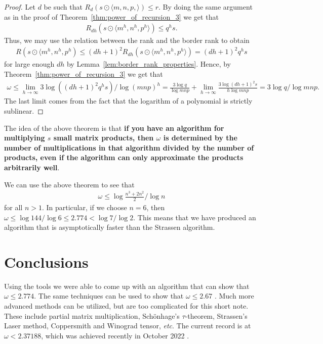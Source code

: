 \documentclass{article}
\theoremstyle{plain}
\theoremstyle{definition}
\theoremstyle{remark}
\begin{document}
\begin{proof}
Let $d$ be such that $R_d(s \odot \langle m, n, p, \rangle) \leq r$. By doing the same argument as in the proof of Theorem~\ref{thm:power_of_recursion_3} we get that
\begin{align*}
    R_{dh}(s \odot \langle m^h, n^h, p^h \rangle) \leq q^h s.
\end{align*}
Thus, we may use the relation between the rank and the border rank to obtain
\begin{align*}
    R(s \odot \langle m^h, n^h, p^h) \leq (dh + 1)^2 R_{dh}(s \odot \langle m^h, n^h, p^h \rangle) = (dh + 1)^2 q^h s
\end{align*}
for large enough $dh$ by Lemma~\ref{lem:border_rank_properties}. Hence, by Theorem~\ref{thm:power_of_recursion_3} we get that
\begin{align*}
    \omega \leq \lim_{h \to \infty} 3 \log \left( (dh + 1)^2 q^h s \right) / \log (mnp)^h = \frac{3\log q}{\log mnp} + \lim_{h \to \infty} \frac{3 \log (dh + 1)^2 s}{h \log mnp} = 3 \log q / \log mnp.
\end{align*}
The last limit comes from the fact that the logarithm of a polynomial is strictly sublinear.
\end{proof}

The idea of the above theorem is that \textbf{if you have an algorithm for multiplying $s$ small matrix products, then $\omega$ is determined by the number of multiplications in that algorithm divided by the number of products, even if the algorithm can only approximate the products arbitrarily well}. 

We can use the above theorem to see that
\begin{align*}
    \omega \leq \log \frac{n^3 + 2n^2}{2} / \log n
\end{align*}
for all $n > 1$. In particular, if we choose $n = 6$, then $\omega \leq \log 144 / \log 6 \leq 2.774 < \log 7 / \log 2$. This means that we have produced an algorithm that is asymptotically faster than the Strassen algorithm.

\section{Conclusions}

Using the tools we were able to come up with an algorithm that can show that $\omega \leq 2.774$. The same techniques can be used to show that $\omega \leq 2.67$ \cite{pan1984how}. Much more advanced methods can be utilized, but are too complicated for this short note. These include partial matrix multiplication, Schönhage's $\tau$-theorem, Strassen's Laser method, Coppersmith and Winograd tensor, \emph{etc}. The current record is at $\omega < 2.37188$, which was achieved recently in October 2022 \cite{duan2022faster}.
\end{document}
